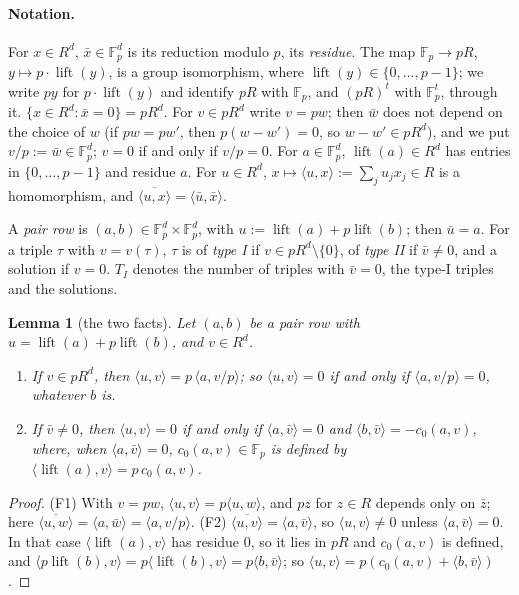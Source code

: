 \documentclass[11pt]{article}
\newtheorem{lemma}[theorem]{Lemma}
\theoremstyle{definition}
\theoremstyle{remark}
\newcommand{\Fp}{\mathbb{F}_p}
\DeclareMathOperator{\lift}{lift}
\begin{document}
\paragraph{Notation.} For $x\in R^d$, $\bar x\in\Fp^d$ is its reduction modulo $p$, its \emph{residue}. The map $\Fp\to pR$, $y\mapsto p\cdot\lift(y)$, is a group isomorphism, where $\lift(y)\in\{0,\dots,p-1\}$; we write $py$ for $p\cdot\lift(y)$ and identify $pR$ with $\Fp$, and $(pR)^t$ with $\Fp^t$, through it. $\{x\in R^d:\bar x=0\}=pR^d$. For $v\in pR^d$ write $v=pw$; then $\bar w$ does not depend on the choice of $w$ (if $pw=pw'$, then $p(w-w')=0$, so $w-w'\in pR^d$), and we put $v/p:=\bar w\in\Fp^d$; $v=0$ if and only if $v/p=0$. For $a\in\Fp^d$, $\lift(a)\in R^d$ has entries in $\{0,\dots,p-1\}$ and residue $a$. For $u\in R^d$, $x\mapsto\langle u,x\rangle:=\sum_ju_jx_j\in R$ is a homomorphism, and $\overline{\langle u,x\rangle}=\langle\bar u,\bar x\rangle$.

A \emph{pair row} is $(a,b)\in\Fp^d\times\Fp^d$, with $u:=\lift(a)+p\lift(b)$; then $\bar u=a$. For a triple $\tau$ with $v=v(\tau)$, $\tau$ is of \emph{type I} if $v\in pR^d\setminus\{0\}$, of \emph{type II} if $\bar v\ne0$, and a solution if $v=0$. $T_I$ denotes the number of triples with $\bar v=0$, the type-I triples and the solutions.

\begin{lemma}[the two facts]\label{g:lem:facts}
Let $(a,b)$ be a pair row with $u=\lift(a)+p\lift(b)$, and $v\in R^d$.
\begin{enumerate}[label=\textup{(F\arabic*)}]
\item If $v\in pR^d$, then $\langle u,v\rangle=p\,\langle a,v/p\rangle$; so $\langle u,v\rangle=0$ if and only if $\langle a,v/p\rangle=0$, whatever $b$ is.
\item If $\bar v\ne0$, then $\langle u,v\rangle=0$ if and only if $\langle a,\bar v\rangle=0$ and $\langle b,\bar v\rangle=-c_0(a,v)$, where, when $\langle a,\bar v\rangle=0$, $c_0(a,v)\in\Fp$ is defined by $\langle\lift(a),v\rangle=p\,c_0(a,v)$.
\end{enumerate}
\end{lemma}
\begin{proof}
(F1) With $v=pw$, $\langle u,v\rangle=p\langle u,w\rangle$, and $pz$ for $z\in R$ depends only on $\bar z$; here $\overline{\langle u,w\rangle}=\langle a,\bar w\rangle=\langle a,v/p\rangle$. (F2) $\overline{\langle u,v\rangle}=\langle a,\bar v\rangle$, so $\langle u,v\rangle\ne0$ unless $\langle a,\bar v\rangle=0$. In that case $\langle\lift(a),v\rangle$ has residue $0$, so it lies in $pR$ and $c_0(a,v)$ is defined, and $\langle p\lift(b),v\rangle=p\langle\lift(b),v\rangle=p\langle b,\bar v\rangle$; so $\langle u,v\rangle=p(c_0(a,v)+\langle b,\bar v\rangle)$.
\end{proof}
\end{document}
